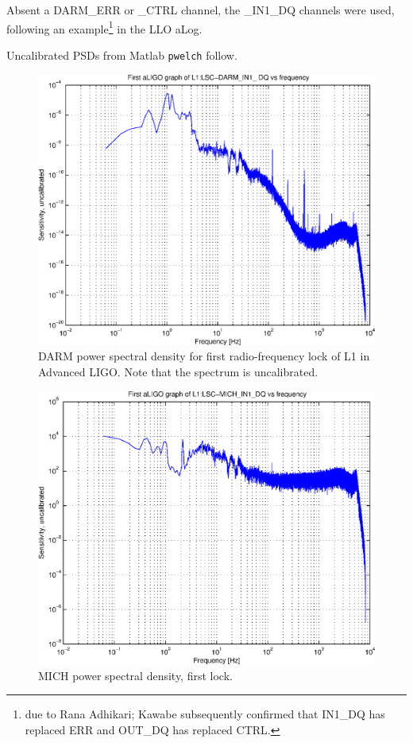 Absent a DARM\_ERR or \_CTRL channel, the \_IN1\_DQ channels were used, following an example\footnote{due to Rana Adhikari; Kawabe subsequently confirmed that IN1\_DQ has replaced ERR and OUT\_DQ has replaced CTRL.}
in the LLO aLog.

Uncalibrated PSDs from Matlab \texttt{pwelch} follow.

\begin{figure}
\begin{center}
\includegraphics[width=0.4\paperwidth,height=0.3\paperheight]{aLIGOfirstLockSensitivity.eps}
\caption{
DARM power spectral density for first radio-frequency lock of L1 in Advanced LIGO. Note that the spectrum is uncalibrated.
}
\end{center}
\end{figure}
\begin{figure}
\begin{center}
\includegraphics[width=0.4\paperwidth,height=0.3\paperheight]{aLIGOfirstLockMICH.eps}
\caption{
MICH power spectral density, first lock.
}
\end{center}
\end{figure}
